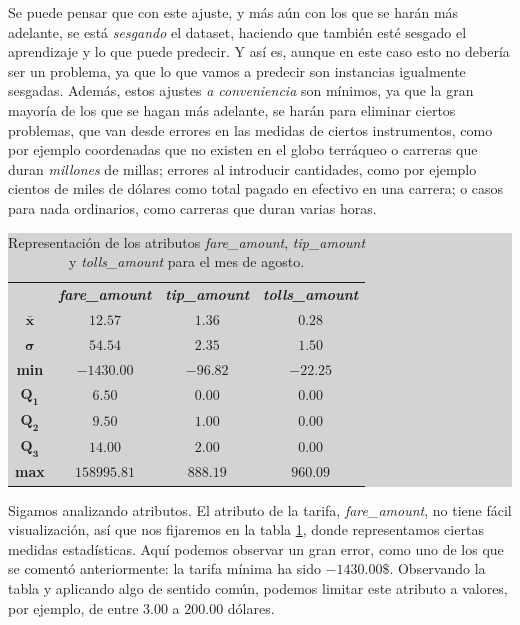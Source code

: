 Se puede pensar que con este ajuste, y más aún con los que se harán más adelante, se está \emph{sesgando} el dataset, haciendo que también esté sesgado el aprendizaje y lo que puede predecir. Y así es, aunque en este caso esto no debería ser un problema, ya que lo que vamos a predecir son instancias igualmente sesgadas. Además, estos ajustes \emph{a conveniencia} son mínimos, ya que la gran mayoría de los que se hagan más adelante, se harán para eliminar ciertos problemas, que van desde errores en las medidas de ciertos instrumentos, como por ejemplo coordenadas que no existen en el globo terráqueo o carreras que duran \emph{millones} de millas; errores al introducir cantidades, como por ejemplo cientos de miles de dólares como total pagado en efectivo en una carrera; o casos para nada ordinarios, como carreras que duran varias horas.

\begin{table}[ht]
\centering
\colorbox{lightgray}{\begin{tabular}{*{4}{c}}
  & \emph{\textbf{fare\_amount}} & \emph{\textbf{tip\_amount}} & \emph{\textbf{tolls\_amount}} \\
  $\mathbf{\bar{x}}$ & $12.57$ & $1.36$ & $0.28$ \\
  $\mathbf{\sigma}$ & $54.54$ & $2.35$ & $1.50$ \\
  \textbf{min} & $-1430.00$ & $-96.82$ & $-22.25$ \\
  $\mathbf{Q_{1}}$ & $6.50$ & $0.00$ & $0.00$ \\
  $\mathbf{Q_{2}}$ & $9.50$ & $1.00$ & $0.00$ \\
  $\mathbf{Q_{3}}$ & $14.00$ & $2.00$ & $0.00$ \\
  \textbf{max} & $158995.81$ & $888.19$ & $960.09$
\end{tabular}}
\caption{Representación de los atributos \emph{fare\_amount}, \emph{tip\_amount} y \emph{tolls\_amount} para el mes de agosto.}
\label{table:5.1}
\end{table}

Sigamos analizando atributos. El atributo de la tarifa, \emph{fare\_amount}, no tiene fácil visualización, así que nos fijaremos en la tabla \ref{table:5.1}, donde representamos ciertas medidas estadísticas. Aquí podemos observar un gran error, como uno de los que se comentó anteriormente: la tarifa mínima ha sido $-1430.00\$$. Observando la tabla y aplicando algo de sentido común, podemos limitar este atributo a valores, por ejemplo, de entre $3.00$ a $200.00$ dólares.

